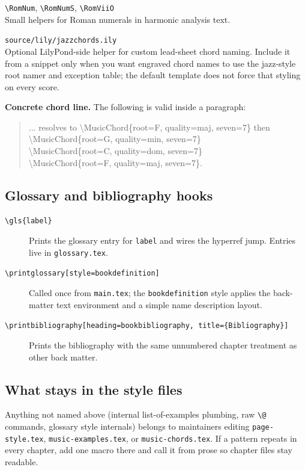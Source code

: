 \noindent\texttt{\textbackslash RomNum}, \texttt{\textbackslash RomNumS}, \texttt{\textbackslash RomViiO}\\
Small helpers for Roman numerals in harmonic analysis text.

\noindent\texttt{source/lily/jazzchords.ily}\\
Optional LilyPond-side helper for custom lead-sheet chord naming. Include it from a snippet only when you want engraved chord names to use the jazz-style root namer and exception table; the default template does not force that styling on every score.

\noindent\textbf{Concrete chord line.} The following is valid inside a paragraph:

\begin{quote}
\ttfamily\raggedright
... resolves to \textbackslash MusicChord\{root=F, quality=maj, seven=7\} then\\
\textbackslash MusicChord\{root=G, quality=min, seven=7\}\\
\textbackslash MusicChord\{root=C, quality=dom, seven=7\}\\
\textbackslash MusicChord\{root=F, quality=maj, seven=7\}.
\end{quote}

\subsection*{Glossary and bibliography hooks}

\begin{description}
  \item[\texttt{\textbackslash gls\{label\}}]
  Prints the glossary entry for \verb|label| and wires the hyperref jump. Entries live in \verb|glossary.tex|.
  \item[\texttt{\textbackslash printglossary[style=bookdefinition]}]
  Called once from \verb|main.tex|; the \verb|bookdefinition| style applies the back-matter text environment and a simple name\,\textemdash\,description layout.
  \item[\texttt{\textbackslash printbibliography[heading=bookbibliography, title=\{Bibliography\}]}]
  Prints the bibliography with the same unnumbered chapter treatment as other back matter.
\end{description}

\subsection*{What stays in the style files}

Anything not named above (internal list-of-examples plumbing, raw \verb|\@| commands, glossary style internals) belongs to maintainers editing \verb|page-style.tex|, \verb|music-examples.tex|, or \verb|music-chords.tex|. If a pattern repeats in every chapter, add one macro there and call it from prose so chapter files stay readable.
